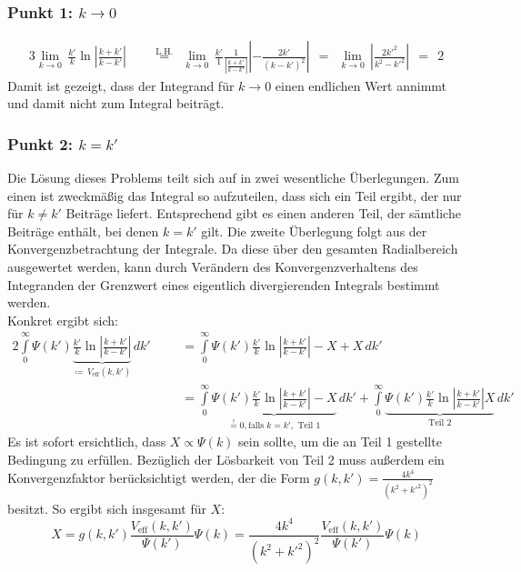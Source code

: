 \subsubsection{Punkt 1: $k\rightarrow0$}
\begin{alignat*}{3}
\lim_{k\rightarrow 0}\,\frac{k '}{k}\ln{\left |\frac{k + k '}{k-k'}\right |} \ \  &&  \stackrel{\text{L.H.}}{=} \ \ \lim_{k\rightarrow 0}\,\frac{k '}{1}\frac{1}{\left |\frac{k + k '}{k-k'}\right |}\left |-\frac{2k'}{(k-k')^2}\right | \ \ = \ \  \lim_{k\rightarrow 0}\,\left |\frac{2k '^2}{{k^2 - k '^2}}\right | \ \ = \ \ 2 
\end{alignat*}
Damit ist gezeigt, dass der Integrand für $k \rightarrow 0$ einen endlichen Wert annimmt und damit nicht zum Integral beiträgt. 
\subsubsection{Punkt 2: $k = k'$}
Die Lösung dieses Problems teilt sich auf in zwei wesentliche Überlegungen. Zum einen ist zweckmäßig das Integral so aufzuteilen, dass sich ein Teil ergibt, der nur für $k\neq k'$ Beiträge liefert. Entsprechend gibt es einen anderen Teil, der sämtliche Beiträge enthält, bei denen $k=k'$ gilt. Die zweite Überlegung folgt aus der Konvergenzbetrachtung der Integrale. Da diese über den gesamten Radialbereich ausgewertet werden, kann durch Verändern des Konvergenzverhaltens des Integranden der Grenzwert eines eigentlich divergierenden Integrals bestimmt werden. \\
Konkret ergibt sich: 
\begin{alignat*}{2}
\int\limits_{0}^{\infty} \Psi(k ')\underbrace{\frac{k '}{k}\ln{\left |\frac{k + k '}{k-k'}\right |}}_{\coloneqq \, V_\text{eff}(k,k')}\, dk' && &=\int\limits_{0}^{\infty} \Psi(k ')\frac{k '}{k}\ln{\left |\frac{k +k '}{k-k'}\right |}-X+X\, dk'\\
&& &= \int\limits_{0}^{\infty} \underbrace{\Psi(k ')\frac{k '}{k}\ln{\left |\frac{k + k '}{k-k'}\right |}-X}_{\stackrel{!}{=}0,\text{falls }k=k',\text{ Teil 1}}\, dk' + 
		 	\int\limits_{0}^{\infty} \underbrace{\Psi(k ')\frac{k '}{k}\ln{\left |\frac{k + k '}{k-k'}\right |}X}_{\text{Teil 2}}\, dk' 
\end{alignat*}
Es ist sofort ersichtlich, dass $X \propto \Psi(k)$ sein sollte, um die an Teil 1 gestellte Bedingung zu erfüllen. Bezüglich der Lösbarkeit von Teil 2 muss außerdem ein Konvergenzfaktor berücksichtigt werden, der die Form $g(k,k') = \frac{4k^4}{(k^2 + k'^2)^2}$ besitzt. So ergibt sich insgesamt für $X$: 
$$X = g(k,k')\frac{V_\text{eff}(k,k')}{\Psi(k')}\Psi(k)  = \frac{4k^4}{(k^2+k '^2) ^2}\frac{V_\text{eff}(k,k')}{\Psi(k')}\Psi(k)$$
